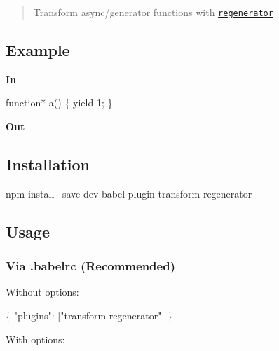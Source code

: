 \begin{quote}
Transform async/generator functions with \href{https://github.com/facebook/regenerator}{\tt regenerator} \end{quote}


\subsection*{Example}

{\bfseries In}


\begin{DoxyCode}
function* a() \{
  yield 1;
\}
\end{DoxyCode}


{\bfseries Out}




\subsection*{Installation}


\begin{DoxyCode}
npm install --save-dev babel-plugin-transform-regenerator
\end{DoxyCode}


\subsection*{Usage}

\subsubsection*{Via {\ttfamily .babelrc} (Recommended)}

Without options\+:


\begin{DoxyCode}
\{
  "plugins": ["transform-regenerator"]
\}
\end{DoxyCode}


With options\+:

